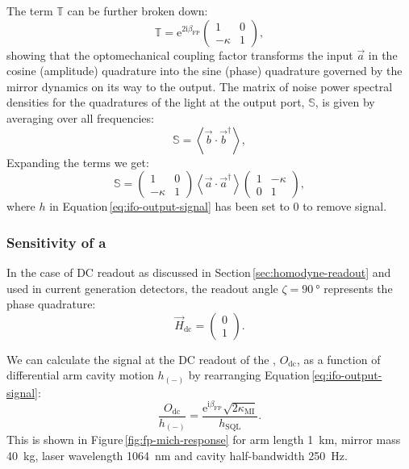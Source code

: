 The term $\mathbb{T}$ can be further broken down:
\begin{equation}
  \mathbb{T} = \text{e}^{2 \text{i} \beta_{\text{FP}}}
  \begin{pmatrix}
    1 & 0 \\
    -\kappa & 1
  \end{pmatrix},
\end{equation}
showing that the optomechanical coupling factor transforms the input $\vec{a}$ in the cosine (amplitude) quadrature into the sine (phase) quadrature governed by the mirror dynamics on its way to the output. The matrix of noise power spectral densities for the quadratures of the light at the output port, $\mathbb{S}$, is given by averaging over all frequencies:
\begin{equation}
  \mathbb{S} = \left< \vec{b} \cdot \vec{b}^{\dag} \right>,
\end{equation}
Expanding the terms we get:
\begin{equation}
  \mathbb{S} =
  \begin{pmatrix}
    1 & 0 \\
    -\kappa & 1
  \end{pmatrix}
  \left< \vec{a} \cdot \vec{a}^{\dag} \right>
  \begin{pmatrix}
    1 & -\kappa \\
    0 & 1
  \end{pmatrix},
\end{equation}
where $h$ in Equation\,\ref{eq:ifo-output-signal} has been set to \num{0} to remove signal.

\subsubsection{Sensitivity of a \FPMI{}}
In the case of \gls{DC} readout as discussed in Section\,\ref{sec:homodyne-readout} and used in current generation detectors, the readout angle $\zeta = \SI{90}{\degree}$ represents the phase quadrature:
\begin{equation}
  \vec{H}_{\text{dc}} =
  \begin{pmatrix}
    0 \\
    1
  \end{pmatrix}.
\end{equation}

We can calculate the signal at the \gls{DC} readout of the \FPMI{}, $O_{\text{dc}}$, as a function of differential arm cavity motion $h_{\left( - \right)}$ by rearranging Equation\,\ref{eq:ifo-output-signal}:
\begin{equation}
  \frac{O_{\text{dc}}}{h_{\left( - \right)}} = \frac{\text{e}^{\text{i} \beta_{\text{FP}}} \sqrt{2 \kappa_{\text{MI}}}}{h_{\text{SQL}}}.
\end{equation}
This is shown in Figure\,\ref{fig:fp-mich-response} for arm length \SI{1}{\kilo\meter}, mirror mass \SI{40}{\kilo\gram}, laser wavelength \SI{1064}{\nano\meter} and cavity half-bandwidth \SI{250}{\hertz}.


